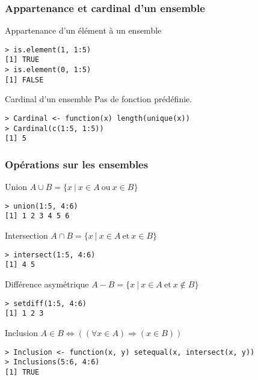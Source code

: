 \documentclass[10pt]{beamer}
\begin{document}
\begin{frame}[fragile]
  \frametitle{Appartenance et cardinal d'un ensemble}

  \begin{block}{Appartenance d'un élément à un ensemble}
    \begin{lstlisting}[style=block]
> is.element(1, 1:5)
[1] TRUE
> is.element(0, 1:5)
[1] FALSE
\end{lstlisting}
  \end{block}

  \begin{exampleblock}{Cardinal d'un ensemble}
    Pas de fonction prédéfinie.
    \begin{lstlisting}[style=block]
> Cardinal <- function(x) length(unique(x))
> Cardinal(c(1:5, 1:5))
[1] 5
\end{lstlisting}
\end{exampleblock}

\end{frame}


\begin{frame}[fragile]
  \frametitle{Opérations sur les ensembles}
  \begin{block}{Union $A \cup B = \{x\ |\ x \in A\ \mathrm{ou}\ x \in B\}$}
    \begin{lstlisting}[aboveskip = \bigskipamount]
> union(1:5, 4:6)
[1] 1 2 3 4 5 6      
    \end{lstlisting}
  \end{block}

    \begin{block}{Intersection $A \cap B = \{x\ |\ x \in A\ \mathrm{et}\ x \in B\}$}
    \begin{lstlisting}[aboveskip = \bigskipamount]
> intersect(1:5, 4:6)
[1] 4 5
    \end{lstlisting}
  \end{block}

  \begin{block}{Différence asymétrique $A - B = \{x\ |\ x \in A\ \mathrm{et}\ x \notin B\}$}
    \begin{lstlisting}[aboveskip = \bigskipamount]
> setdiff(1:5, 4:6)
[1] 1 2 3
    \end{lstlisting}
  \end{block}

  \begin{exampleblock}{Inclusion $A \in B \Leftrightarrow \left((\forall x \in A) \Rightarrow (x \in B)\right)$}
    \begin{lstlisting}[aboveskip = \bigskipamount]
> Inclusion <- function(x, y) setequal(x, intersect(x, y))
> Inclusions(5:6, 4:6)
[1] TRUE
    \end{lstlisting}
  \end{exampleblock}
  

\end{frame}
\end{document}
